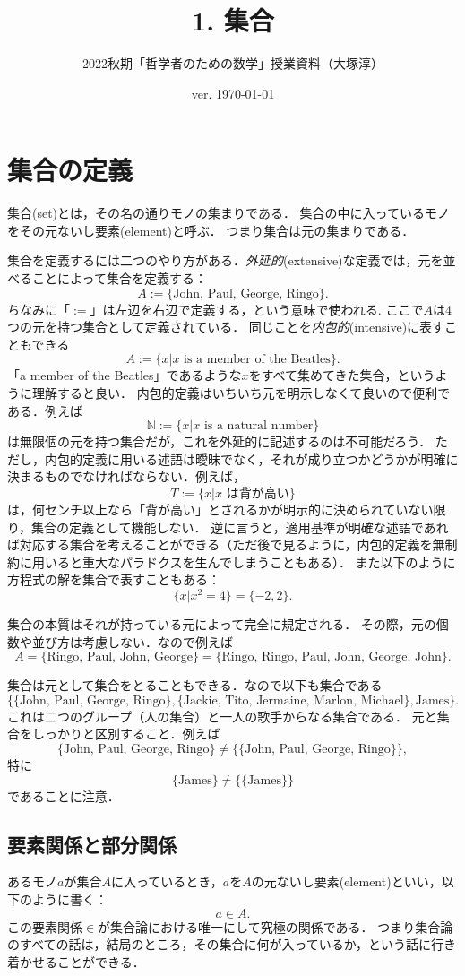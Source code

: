\documentclass[11pt,a4paper]{jsarticle}
\begin{document}
\title{1. 集合}
\author{2022秋期「哲学者のための数学」授業資料（大塚淳）}
\date{ver. \today}
\maketitle

\section{集合の定義}
集合(set)とは，その名の通りモノの集まりである．
集合の中に入っているモノをその元ないし要素(element)と呼ぶ．
つまり集合は元の集まりである．

集合を定義するには二つのやり方がある．\emph{外延的}(extensive)な定義では，元を並べることによって集合を定義する：
\[
 A := \{\text{John, Paul, George, Ringo}\}.
\]
ちなみに「$:=$」は左辺を右辺で定義する，という意味で使われる.
ここで$A$は4つの元を持つ集合として定義されている．
同じことを\emph{内包的}(intensive)に表すこともできる
\[
 A := \{x | x \text{ is a member of the Beatles}\}.
\]
「a member of the Beatles」であるような$x$をすべて集めてきた集合，というように理解すると良い．
内包的定義はいちいち元を明示しなくて良いので便利である．例えば
\[
 \mathbb{N} := \{x | x \text{ is a natural number}\}
\]
は無限個の元を持つ集合だが，これを外延的に記述するのは不可能だろう．
ただし，内包的定義に用いる述語は曖昧でなく，それが成り立つかどうかが明確に決まるものでなければならない．例えば，
\[
 T := \{x | x \text{ は背が高い}\}
\]
は，何センチ以上なら「背が高い」とされるかが明示的に決められていない限り，集合の定義として機能しない．
逆に言うと，適用基準が明確な述語であれば対応する集合を考えることができる（ただ後で見るように，内包的定義を無制約に用いると重大なパラドクスを生んでしまうこともある）．
また以下のように方程式の解を集合で表すこともある：
\[
 \{ x | x^2 = 4\} = \{ -2, 2 \}.
\]



集合の本質はそれが持っている元によって完全に規定される．
その際，元の個数や並び方は考慮しない．なので例えば
\[
 A = \{\text{Ringo, Paul, John, George}\} = \{\text{Ringo, Ringo, Paul, John, George, John}\}.
\]

集合は元として集合をとることもできる．なので以下も集合である
\[
\{ \{\text{John, Paul, George, Ringo}\}, \{ \text{Jackie, Tito, Jermaine, Marlon, Michael}\}, \text{James} \}.
\]
これは二つのグループ（人の集合）と一人の歌手からなる集合である．
元と集合をしっかりと区別すること．例えば
\[
\{\text{John, Paul, George, Ringo}\} \neq \{ \{\text{John, Paul, George, Ringo}\} \},
\]
特に
\[
\{\text{James}\} \neq \{ \{\text{James}\} \}  
\]
であることに注意．

\subsection{要素関係と部分関係}

あるモノ$a$が集合$A$に入っているとき，$a$を$A$の元ないし要素(element)といい，以下のように書く：
\[
 a \in A.
\]
この要素関係$\in$が集合論における唯一にして究極の関係である．
つまり集合論のすべての話は，結局のところ，その集合に何が入っているか，という話に行き着かせることができる．



%



%
\end{document}
